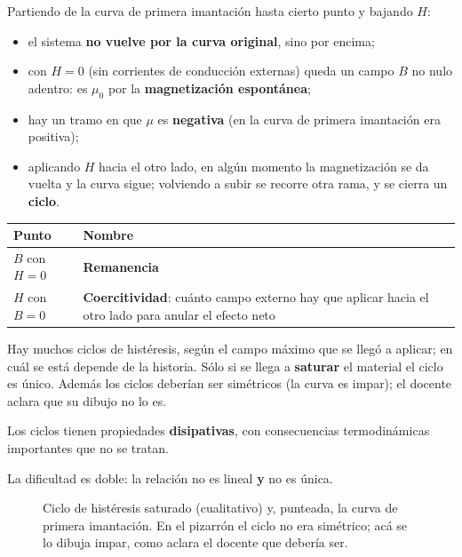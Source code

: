 \documentclass[12pt,a4paper]{article}
\begin{document}
Partiendo de la curva de primera imantación hasta cierto punto y bajando $H$:

\begin{itemize}
  \item el sistema \textbf{no vuelve por la curva original}, sino por encima;
  \item con $H = 0$ (sin corrientes de conducción externas) queda un campo $B$ no
  nulo adentro: es $\mu_0$ por la \textbf{magnetización espontánea};
  \item hay un tramo en que $\mu$ es \textbf{negativa} (en la curva de primera
  imantación era positiva);
  \item aplicando $H$ hacia el otro lado, en algún momento la magnetización se da
  vuelta y la curva sigue; volviendo a subir se recorre otra rama, y se cierra
  un \textbf{ciclo}.
\end{itemize}

\begin{center}
\renewcommand{\arraystretch}{1.35}
\small
\begin{tabularx}{\textwidth}{l>{\raggedright\arraybackslash}X}
\toprule
\textbf{Punto} & \textbf{Nombre} \\
\midrule
$B$ con $H = 0$ & \textbf{Remanencia} \\
$H$ con $B = 0$ & \textbf{Coercitividad}: cuánto campo externo hay que aplicar hacia el otro lado para anular el efecto neto \\
\bottomrule
\end{tabularx}
\end{center}

\begin{warnbox}
Hay muchos ciclos de histéresis, según el campo
máximo que se llegó a aplicar; en cuál se está depende de la historia. Sólo
si se llega a \textbf{saturar} el material el ciclo es único. Además los ciclos
deberían ser simétricos (la curva es impar); el docente aclara que su dibujo
no lo es.
\end{warnbox}

Los ciclos tienen propiedades \textbf{disipativas}, con consecuencias
termodinámicas importantes que no se tratan.

La dificultad es doble: la relación no es lineal \textbf{y} no es única.

\begin{figure}[H]
  \centering
  
  \caption{Ciclo de histéresis saturado (cualitativo) y, punteada, la curva de primera imantación. En el pizarrón el ciclo no era simétrico; acá se lo dibuja impar, como aclara el docente que debería ser.}
\end{figure}
\end{document}
